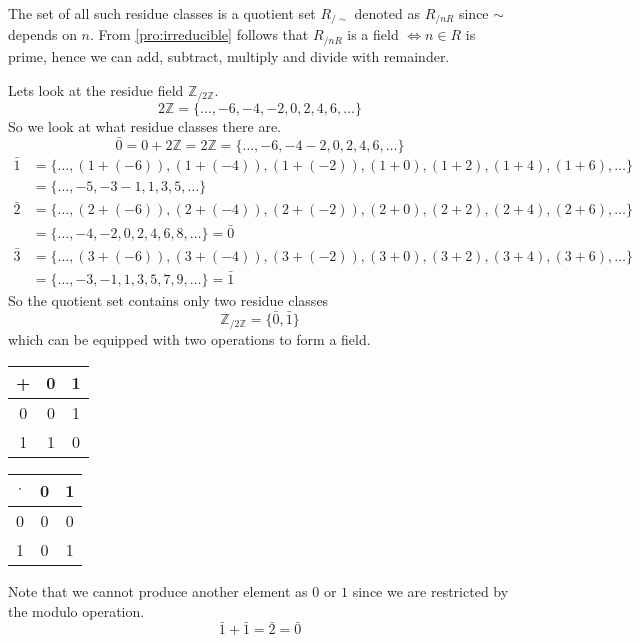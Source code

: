 The set of all such residue classes is a quotient set \(R_{/\sim}\) denoted as \(R_{/nR}\) since \(\sim\) depends on \(n\).
From \cref{pro:irreducible} follows that \(R_{/nR}\) is a field \(\iff n \in R\) is prime, hence we can add, subtract, multiply and divide with remainder.

\begin{example}
   Lets look at the residue field \(\mathbb{Z}_{/2\mathbb{Z}}\).
   \[2\mathbb{Z} = \{\ldots, -6, -4, -2, 0, 2, 4, 6, \ldots\}\]
   So we look at what residue classes there are.
   \[\bar{0} = 0 + 2\mathbb{Z} = 2\mathbb{Z} = \{\ldots, -6, -4 -2, 0, 2, 4, 6, \ldots\}\]
   \begin{equation*}
      \begin{split}
   \bar{1} & = \{\ldots, (1+(-6)), (1+(-4)), (1+(-2)), (1+0), (1+2), (1+4), (1+6), \ldots\} \\
                & = \{\ldots, -5, -3 -1, 1, 3, 5, \ldots\}
      \end{split}
   \end{equation*}
   \begin{equation*}
      \begin{split}
         \bar{2} &= \{\ldots, (2+(-6)), (2+(-4)), (2+(-2)), (2+0), (2+2), (2+4), (2+6), \ldots\} \\
                      &= \{\ldots, -4, -2, 0, 2, 4, 6, 8, \ldots\} = \bar{0}
      \end{split}
   \end{equation*}
   \begin{equation*}
      \begin{split}
         \bar{3} &= \{\ldots, (3+(-6)), (3+(-4)), (3+(-2)), (3+0), (3+2), (3+4), (3+6), \ldots\} \\
                      &= \{\ldots, -3, -1, 1, 3, 5, 7, 9, \ldots\} = \bar{1}
      \end{split}
   \end{equation*}
   So the quotient set contains only two residue classes
   \[\mathbb{Z}_{/2\mathbb{Z}} = \{\bar{0}, \bar{1}\}\]
   which can be equipped with two operations to form a field.

   \begin{center}
      \renewcommand\arraystretch{1.3}
      \begin{tabular}{c|c c}
         +   & 0   & 1 \\ \hline
         0   & 0   & 1 \\
         1   & 1   & 0 \\
      \end{tabular}
      \quad
      \begin{tabular}{c|c c}
         \(\cdot\) & 0   & 1 \\ \hline
         0         & 0   & 0 \\
         1         & 0   & 1 \\
      \end{tabular}
   \end{center}
   Note that we cannot produce another element as \(0\) or \(1\) since we are restricted by the modulo operation.
   \[\bar{1} + \bar{1} = \bar{2} = \bar{0}\]
\end{example}


